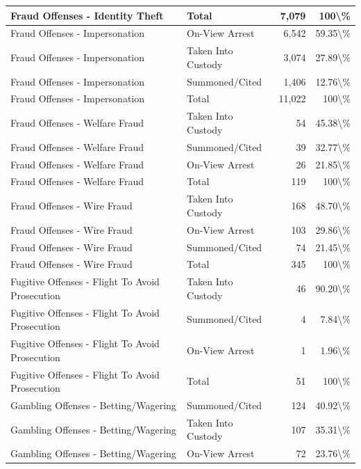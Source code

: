 \documentclass[
]{krantz}
\begin{document}
\begin{longtable}[t]{l|l|r|r}
\hline
Fraud Offenses - Identity Theft & Total & 7,079 & 100\textbackslash{}\%\\
\hline
Fraud Offenses - Impersonation & On-View Arrest & 6,542 & 59.35\textbackslash{}\%\\
\hline
Fraud Offenses - Impersonation & Taken Into Custody & 3,074 & 27.89\textbackslash{}\%\\
\hline
Fraud Offenses - Impersonation & Summoned/Cited & 1,406 & 12.76\textbackslash{}\%\\
\hline
Fraud Offenses - Impersonation & Total & 11,022 & 100\textbackslash{}\%\\
\hline
Fraud Offenses - Welfare Fraud & Taken Into Custody & 54 & 45.38\textbackslash{}\%\\
\hline
Fraud Offenses - Welfare Fraud & Summoned/Cited & 39 & 32.77\textbackslash{}\%\\
\hline
Fraud Offenses - Welfare Fraud & On-View Arrest & 26 & 21.85\textbackslash{}\%\\
\hline
Fraud Offenses - Welfare Fraud & Total & 119 & 100\textbackslash{}\%\\
\hline
Fraud Offenses - Wire Fraud & Taken Into Custody & 168 & 48.70\textbackslash{}\%\\
\hline
Fraud Offenses - Wire Fraud & On-View Arrest & 103 & 29.86\textbackslash{}\%\\
\hline
Fraud Offenses - Wire Fraud & Summoned/Cited & 74 & 21.45\textbackslash{}\%\\
\hline
Fraud Offenses - Wire Fraud & Total & 345 & 100\textbackslash{}\%\\
\hline
Fugitive Offenses - Flight To Avoid Prosecution & Taken Into Custody & 46 & 90.20\textbackslash{}\%\\
\hline
Fugitive Offenses - Flight To Avoid Prosecution & Summoned/Cited & 4 & 7.84\textbackslash{}\%\\
\hline
Fugitive Offenses - Flight To Avoid Prosecution & On-View Arrest & 1 & 1.96\textbackslash{}\%\\
\hline
Fugitive Offenses - Flight To Avoid Prosecution & Total & 51 & 100\textbackslash{}\%\\
\hline
Gambling Offenses - Betting/Wagering & Summoned/Cited & 124 & 40.92\textbackslash{}\%\\
\hline
Gambling Offenses - Betting/Wagering & Taken Into Custody & 107 & 35.31\textbackslash{}\%\\
\hline
Gambling Offenses - Betting/Wagering & On-View Arrest & 72 & 23.76\textbackslash{}\%\\

\end{longtable}
\end{document}
